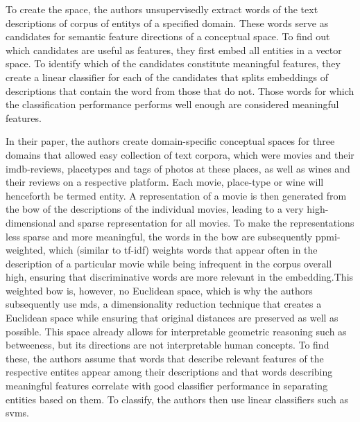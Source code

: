 To create the space, the authors unsupervisedly extract words of the text descriptions of corpus of \glspl{entity} of a specified domain. These words serve as candidates for semantic feature directions of a conceptual space. To find out which candidates are useful as features, they first embed all entities in a vector space. To identify which of the candidates constitute meaningful features, they create a linear classifier for each of the candidates that splits embeddings of descriptions that contain the word from those that do not. Those words for which the classification performance performs well enough are considered meaningful features.  

In their paper, the authors create domain-specific conceptual spaces for three domains that allowed easy collection of text corpora, which were movies and their \gls{imdb}-reviews, placetypes and tags of photos at these places, as well as wines and their reviews on a respective platform. Each movie, place-type or wine will henceforth be termed \gls{entity}. A representation of a movie is then generated from the \gls{bow} of the descriptions of the individual movies, leading to a very high-dimensional and sparse representation for all movies. To make the representations less sparse and more meaningful, the words in the \gls{bow} are subsequently \gls{ppmi}-weighted, which (similar to \gls{tf-idf}) weights words that appear often in the description of a particular movie while being infrequent in the corpus overall high, ensuring that discriminative words are more relevant in the embedding.This weighted \gls{bow} is, however, no Euclidean space, which is why the authors subsequently use \gls{mds}, a dimensionality reduction technique that creates a Euclidean space while ensuring that original distances are preserved as well as possible. This space already allows for interpretable geometric reasoning such as betweeness, but its directions are not interpretable human concepts. To find these, the authors assume that words that describe relevant features of the respective entites appear among their descriptions and that words describing meaningful features correlate with good classifier performance in separating entities based on them. To classify, the authors then use linear classifiers such as \glspl{svm}. 

